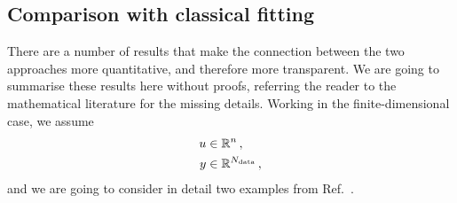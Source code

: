 \subsection{Comparison with classical fitting}
\label{sec:comp-class-fit}

There are a number of results that make the connection between the two
approaches more quantitative, and therefore more transparent. We are
going to summarise these results here without proofs, referring the
reader to the mathematical literature for the missing details. Working
in the finite-dimensional case, we assume 
\begin{align*}
  u &\in \mathbb{R}^n \, ,\\
  y &\in \mathbb{R}^{N_{\rm data}}\, ,
\end{align*}
and we are going to consider in detail two examples from Ref.~\cite{StuartCore}.

